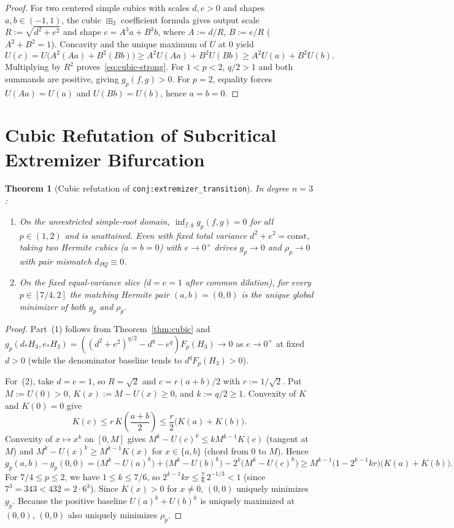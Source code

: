\documentclass[11pt]{article}
\theoremstyle{plain}
\newtheorem{theorem}{Theorem}
\theoremstyle{definition}
\theoremstyle{remark}
\begin{document}
\begin{proof}
For two centered simple cubics with scales $d, e > 0$ and shapes $a, b \in (-1,1)$, the cubic $\boxplus_3$ coefficient formula gives output scale $R := \sqrt{d^2 + e^2}$ and shape $c = A^3 a + B^3 b$, where $A := d/R$, $B := e/R$ ($A^2 + B^2 = 1$). Concavity and the unique maximum of $U$ at $0$ yield
\[
U(c) = U\bigl(A^2(Aa) + B^2(Bb)\bigr) \ge A^2 U(Aa) + B^2 U(Bb) \ge A^2 U(a) + B^2 U(b).
\]
Multiplying by $R^2$ proves~\eqref{eq:cubic-strong}. For $1 < p < 2$, $q/2 > 1$ and both summands are positive, giving $g_p(f,g) > 0$. For $p = 2$, equality forces $U(Aa) = U(a)$ and $U(Bb) = U(b)$, hence $a = b = 0$.
\end{proof}

\section{Cubic Refutation of Subcritical Extremizer Bifurcation}

\begin{theorem}[Cubic refutation of \texttt{conj:extremizer\_transition}]\label{thm:bifurcation}
In degree $n = 3$:
\begin{enumerate}[label=\textup{(\arabic*)}]
\item On the unrestricted simple-root domain, $\inf_{f,g} g_p(f,g) = 0$ for all $p \in (1,2)$ and is unattained. Even with fixed total variance $d^2 + e^2 = \mathrm{const}$, taking two Hermite cubics ($a = b = 0$) with $e \to 0^+$ drives $g_p \to 0$ and $\rho_p \to 0$ with pair mismatch $d_{PQ} \equiv 0$.
\item On the fixed equal-variance slice ($d = e = 1$ after common dilation), for every $p \in [7/4, 2]$ the matching Hermite pair $(a,b) = (0,0)$ is the \emph{unique} global minimizer of both $g_p$ and $\rho_p$.
\end{enumerate}
\end{theorem}

\begin{proof}
Part~(1) follows from Theorem~\ref{thm:cubic} and $g_p(d_* H_3, e_* H_3) = ((d^2+e^2)^{q/2} - d^q - e^q) F_p(H_3) \to 0$ as $e \to 0^+$ at fixed $d > 0$ (while the denominator baseline tends to $d^q F_p(H_3) > 0$).

For~(2), take $d = e = 1$, so $R = \sqrt{2}$ and $c = r(a+b)/2$ with $r := 1/\sqrt{2}$. Put $M := U(0) > 0$, $K(x) := M - U(x) \ge 0$, and $k := q/2 \ge 1$. Convexity of $K$ and $K(0) = 0$ give
\[
K(c) \le r\,K\!\left(\frac{a+b}{2}\right) \le \frac{r}{2}\bigl(K(a) + K(b)\bigr).
\]
Convexity of $x \mapsto x^k$ on $[0,M]$ gives $M^k - U(c)^k \le k M^{k-1} K(c)$ (tangent at $M$) and $M^k - U(x)^k \ge M^{k-1} K(x)$ for $x \in \{a,b\}$ (chord from $0$ to $M$). Hence
\[
g_p(a,b) - g_p(0,0)
= \bigl(M^k - U(a)^k\bigr) + \bigl(M^k - U(b)^k\bigr) - 2^k\bigl(M^k - U(c)^k\bigr)
\ge M^{k-1}\bigl(1 - 2^{k-1} k r\bigr)\bigl(K(a) + K(b)\bigr).
\]
For $7/4 \le p \le 2$, we have $1 \le k \le 7/6$, so $2^{k-1} k r \le \frac{7}{6}\, 2^{-1/3} < 1$ (since $7^3 = 343 < 432 = 2 \cdot 6^3$). Since $K(x) > 0$ for $x \neq 0$, $(0,0)$ uniquely minimizes $g_p$. Because the positive baseline $U(a)^k + U(b)^k$ is uniquely maximized at $(0,0)$, $(0,0)$ also uniquely minimizes $\rho_p$.
\end{proof}
\end{document}
